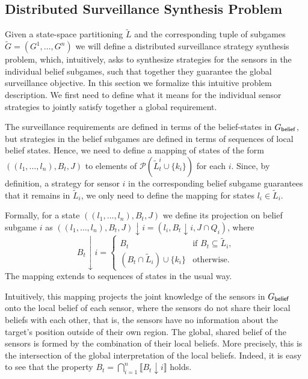 \subsection{Distributed Surveillance Synthesis Problem}\label{sec:distributed-problem}
Given a state-space partitioning $\widetilde L$ and the corresponding tuple of subgames $\widetilde G = (G^1,\ldots,G^n)$
we will define a distributed surveillance strategy synthesis problem, which, intuitively, asks to synthesize strategies for the sensors in the individual belief subgames, such that together they guarantee the global surveillance objective.  In this section we formalize this intuitive problem description. We first need to define what it means for the individual sensor strategies to jointly satisfy together a global requirement.

The surveillance requirements are defined in terms of the belief-states in $G_{\mathsf{belief}}$, but strategies in the belief subgames are defined in terms of sequences of local belief states. Hence, we need to define a mapping of states of the form $((l_1,\ldots,l_n),B_t,J)$ to elements of $\mathcal{P}(\widetilde{L}^i_t \cup \{k_i\})$ for each $i$. Since, by definition, a strategy for sensor $i$ in the corresponding belief subgame guarantees that it remains in $\widetilde L_i$, we only need to define the mapping for states  $l_i \in\widetilde{L}_i$.

Formally, for a state $((l_1,\ldots,l_n),B_t,J)$  we define its projection on belief subgame $i$ as $((l_1,\ldots,l_n),B_t,J){\downarrow}i = (l_i,B_t{\downarrow}i,J \cap Q_i)$, where
\[B_t{\downarrow}i = \begin{cases}
B_t& \text{if }  B_t \subseteq \widetilde L_i, \\
(B_t \cap \widetilde L_i) \cup \{k_i\} & \text{otherwise}.
\end{cases}\]
The mapping extends to sequences of states in the usual way. 

Intuitively, this mapping projects the joint knowledge of the sensors in $G_{\mathsf{belief}}$ onto the local belief of each sensor, where the sensors do not share their local beliefs with each other, that is, the sensors have no information about the target's position outside of their own region. The global, shared belief of the sensors is formed by the combination of their local beliefs. More precisely, this is the intersection of the  global interpretation of the local beliefs. Indeed, it is easy to see that the property $B_t = \bigcap_{i=1}^n \llbracket B_t{\downarrow}i\rrbracket$ holds.

